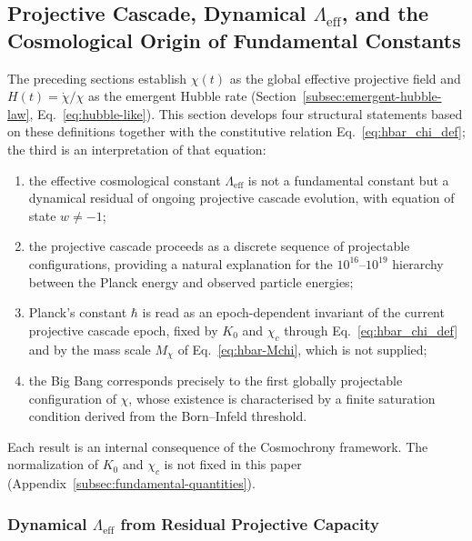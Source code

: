 \subsection{Projective Cascade, Dynamical $\Lambda_{\mathrm{eff}}$,
  and the Cosmological Origin of Fundamental Constants}
  \label{sec:relax-cascade}

  The preceding sections establish $\chi(t)$ as the global effective projective field
  and $H(t) = \dot{\chi}/\chi$ as the emergent Hubble rate (Section~\ref{subsec:emergent-hubble-law},
  Eq.~\eqref{eq:hubble-like}).
  This section develops four structural statements based on these definitions
  together with the constitutive relation Eq.~\eqref{eq:hbar_chi_def};
  the third is an interpretation of that equation:
  \begin{enumerate}
    \item the effective cosmological constant $\Lambda_{\mathrm{eff}}$ is
    not a fundamental constant but a dynamical residual of ongoing projective cascade evolution,
    with equation of state $w \neq -1$;
    \item the projective cascade proceeds as a discrete sequence of projectable
    configurations, providing a natural explanation for the
    $10^{16}$--$10^{19}$ hierarchy between the Planck energy and
    observed particle energies;
    \item Planck's constant $\hbar$ is read as an epoch-dependent invariant of the current projective cascade epoch,
    fixed by $K_0$ and $\chi_c$ through Eq.~\eqref{eq:hbar_chi_def} and by the mass scale $M_\chi$ of
    Eq.~\eqref{eq:hbar-Mchi}, which is not supplied;
    \item the Big Bang corresponds precisely to the first globally
    projectable configuration of $\chi$, whose existence is
    characterised by a finite saturation condition derived from the
    Born--Infeld threshold.
  \end{enumerate}
  Each result is an internal consequence of the Cosmochrony framework.
  The normalization of $K_0$ and $\chi_c$ is not fixed in this paper
  (Appendix~\ref{subsec:fundamental-quantities}).

  \subsubsection*{Dynamical $\Lambda_{\mathrm{eff}}$ from Residual Projective Capacity}
    \label{sec:relax-cascade-lambda}

